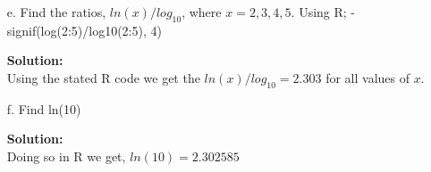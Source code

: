 \documentclass[12pt]{article}
\makeatletter
\theoremstyle{homework}
\newenvironment{exercise}[1]
{\def\@currentlabel{#1}\exercisecore}
{\endexercisecore}
\newcommand{\localhead}[1]{\par\smallskip\noindent\textbf{#1}\nobreak\\}%
\newcommand\solution{\localhead{Solution:}}
\makeatother
\begin{document}
\begin{exercise}{7}
\begin{enumerate}
    \item[e.] Find the ratios, $ln(x)/log_{10}$, where  $x = 2, 3, 4, 5$. Using R; -  signif(log(2:5)/log10(2:5), 4)\\
    \solution Using the stated R code we get the $ln(x)/log_{10} = 2.303$ for all values of $x$. 
    \vspace{.15in}

    \item[f.] Find ln(10)\\
    \solution Doing so in R we get, $ln(10) = 2.302585$
    \vspace{.15in}










  \end{enumerate}
\end{exercise}
\end{document}
